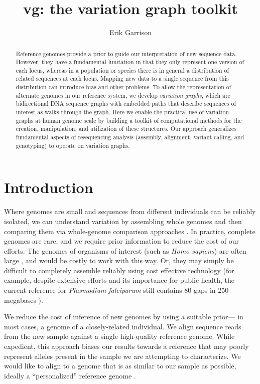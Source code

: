 \documentclass{article}
\begin{document}
\title{vg: the variation graph toolkit}

\author{Erik Garrison}

\maketitle

\begin{abstract}
Reference genomes provide a prior to guide our interpretation of new sequence data.
However, they have a fundamental limitation in that they only represent one version of each locus, whereas
in a population or species there is in general a distribution of related sequences at each locus.
Mapping new data to a single sequence from this distribution can introduce bias and other problems.
To allow the representation of alternate genomes in our reference system, we develop \emph{variation graphs}, which are bidirectional DNA sequence graphs with embedded paths that describe sequences of interest as walks through the graph.
Here we enable the practical use of variation graphs at human genome scale
by building a toolkit of computational methods for the creation, manipulation, and utilization of these structures.
Our approach generalizes fundamental aspects of resequencing analysis (assembly, alignment, variant calling, and genotyping) to operate on variation graphs.
\end{abstract}

\section{Introduction}

Where genomes are small and sequences from different individuals can be reliably isolated, we can understand variation by assembling whole genomes and then comparing them via whole-genome comparison approaches \cite{mummer}.
In practice, complete genomes are rare, and we require prior information to reduce the cost of our efforts.
The genomes of organisms of interest (such as \emph{Homo sapiens}) are often large \cite{pmid11237011}, and would be costly to work with this way.
Or, they may simply be difficult to completely assemble reliably using cost effective technology (for example, despite extensive efforts and its importance for public health, the current reference for \emph{Plasmodium falciparum} still contains 80 gaps in 250 megabases \cite{pfalciparum, pfalciparumweb}).

We reduce the cost of inference of new genomes by using a suitable prior--- in most cases, a genome of a closely-related individual.
We align sequence reads from the new sample against a single high-quality reference genome.
While expedient, this approach biases our results towards a reference that may poorly represent alleles present in the sample we are attempting to characterize.
We would like to align to a genome that is as similar to our sample as possible, ideally a ``personalized'' reference genome \cite{Yuan_2012}.
\end{document}
